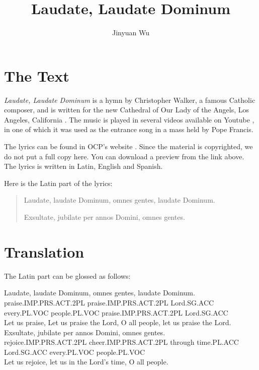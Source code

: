 \documentclass[a4paper]{article}
\title{Laudate, Laudate Dominum}
\author{Jinyuan Wu}
\begin{document}
\maketitle

\section{The Text}

\emph{Laudate, Laudate Dominum} is a hymn by Christopher Walker, a famous Catholic composer, and is written for the new Cathedral of Our Lady of the Angels, Los Angeles, California \cite{ocp-preview}.
The music is played in several videos available on Youtube \cite{youtube-1,youtube-2}, in one of which it was used as the entrance song in a mass held by Pope Francis. 

The lyrics can be found in OCP's website \cite{ocp-preview}. Since the material is copyrighted, we do not put a full copy here. You can download a preview from the link above.
The lyrics is written in Latin, English and Spanish.

Here is the Latin part of the lyrics:
\begin{quotation}
    Laudate, laudate Dominum, omnes gentes, laudate Dominum.

    Exsultate, jubilate per annos Domini, omnes gentes.
\end{quotation}

\section{Translation}

The Latin part can be glossed as follows:
\begin{exe} 
    \sn 
    \gll Laudate,               laudate                Dominum,     omnes       gentes,       laudate                Dominum. \\
         praise.IMP.PRS.ACT.2PL praise.IMP.PRS.ACT.2PL Lord.SG.ACC every.PL.VOC people.PL.VOC praise.IMP.PRS.ACT.2PL Lord.SG.ACC \\
    \glt Let us praise, Let us praise the Lord, O all people, let us praise the Lord.
    \sn 
    \gll Exsultate,              jubilate                per      annos Domini,     omnes        gentes. \\
         rejoice.IMP.PRS.ACT.2PL cheer.IMP.PRS.ACT.2PL   through  time.PL.ACC       Lord.SG.ACC every.PL.VOC people.PL.VOC \\
    \glt Let us rejoice, let us in the Lord's time, O all people.
\end{exe}   


 
\end{document}
